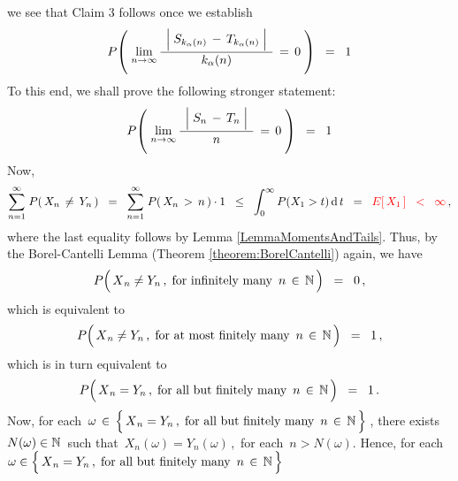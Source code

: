 \begin{enumerate}
we see that Claim 3 follows once we establish
\begin{equation*}
P\!\left(\;
	\underset{n\rightarrow\infty}{\lim}\,
	\dfrac{{\color{white}.}
		\left\vert\;
		S_{k_{\alpha}(n)} \,\overset{{\color{white}.}}{-}\, T_{k_{\alpha}(n)}
		\;\right\vert
		{\color{white}.}}{
		k_{\alpha}(n)
		}
		\,=\, 0
	\;\right)
\;\; = \;\; 1
\end{equation*}
To this end, we shall prove the following stronger statement:
\begin{equation*}
P\!\left(\;
	\underset{n\rightarrow\infty}{\lim}\,
	\dfrac{{\color{white}.}
		\left\vert\;
		S_{n} \,\overset{{\color{white}.}}{-}\, T_{n}
		\;\right\vert
		{\color{white}.}}{
		n
		}
		\,=\, 0
	\;\right)
\;\; = \;\; 1
\end{equation*}
Now,
\begin{equation*}
\overset{\infty}{\underset{n=1}{\sum}}\;P\!\left(\,X_{n} \,\neq\, Y_{n}\,\right)
\;\; = \;\;
	\overset{\infty}{\underset{n=1}{\sum}}\;P\!\left(\,X_{n} \,>\, n\,\right) \cdot 1
\;\; \leq \;\;
	\int_{0}^{\infty}P(X_{1} > t)\,\textnormal{d}\,t
\;\; = \;\;
	{\color{red}E\!\left[\,X_{1}\,\right]
\;\; < \;\;
	\infty}\,,
\end{equation*}
where the last equality follows by Lemma \ref{LemmaMomentsAndTails}.
Thus, by the Borel-Cantelli Lemma (Theorem \ref{theorem:BorelCantelli}) again, we have
\begin{equation*}
P\!\left(\,\overset{{\color{white}.}}{X}_{n} \neq Y_{n}\,,\;\textnormal{for infinitely many \,$n\,\in\,\N$}\,\right)
\;\; = \;\; 0\,,
\end{equation*}
which is equivalent to
\begin{equation*}
P\!\left(\,\overset{{\color{white}.}}{X}_{n} \neq Y_{n}\,,\;\textnormal{for at most finitely many \,$n\,\in\,\N$}\,\right)
\;\; = \;\; 1\,,
\end{equation*}
which is in turn equivalent to
\begin{equation*}
P\!\left(\,\overset{{\color{white}.}}{X}_{n} = Y_{n}\,,\;\textnormal{for all but finitely many \,$n\,\in\,\N$}\,\right)
\;\; = \;\; 1\,.
\end{equation*}
Now, for each
\,$\omega \,\in\, \left\{\,\overset{{\color{white}.}}{X}_{n} = Y_{n}\,,\;\textnormal{for all but finitely many \,$n\,\in\,\N$}\,\right\}$\,, there exists \,$N(\omega) \in \mathbb{N}$\, such that \,$X_{n}(\omega) = Y_{n}(\omega)$\,,\, for each \,$n > N(\omega)$.
Hence, for each
\,$\omega \in \left\{\,\overset{{\color{white}.}}{X}_{n} = Y_{n}\,,\;\textnormal{for all but finitely many \,$n\,\in\,\N$}\,\right\}$\,

\end{enumerate}
